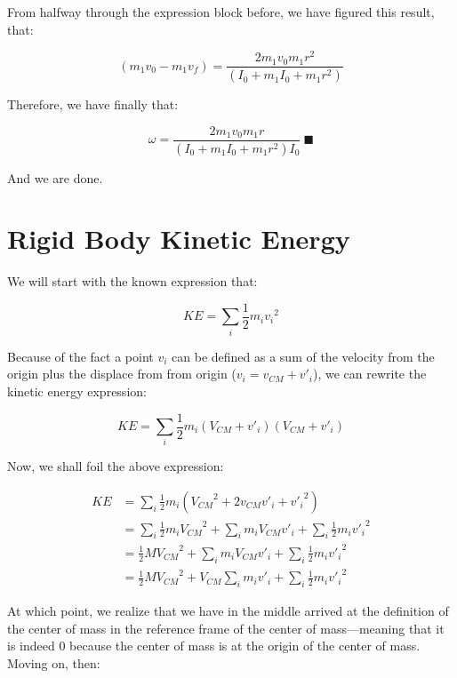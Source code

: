 \documentclass[letterpaper]{article}
\begin{document}
From halfway through the expression block before, we have figured this result, that:

\begin{equation}
 (m_1 v_0 - m_1v_f) = \frac{2m_1 v_0m_1r^2}{(I_0+m_1I_0+m_1r^2)}
\end{equation}

Therefore, we have finally that:

\begin{equation}
    \omega = \frac{2m_1 v_0m_1r}{(I_0+m_1I_0+m_1r^2)I_0}\ \blacksquare
\end{equation}

And we are done.

\section{Rigid Body Kinetic Energy}
\label{sec:org988cefc}
We will start with the known expression that:

\begin{equation}
   KE = \sum_i \frac{1}{2} m_i{v_i}^2
\end{equation}

Because of the fact a point \(v_i\) can be defined as a sum of the velocity from the origin plus the displace from from origin (\(v_i = v_{CM}+v'_i\)), we can rewrite the kinetic energy expression:

\begin{equation}
   KE = \sum_i  \frac{1}{2}  m_i (V_{CM}+v'_i)(V_{CM}+v'_i)
\end{equation}

Now, we shall foil the above expression:

\begin{align}
   KE &= \sum_i  \frac{1}{2}  m_i ({V_{CM}}^2+2v_{CM}v'_i+{v'_i}^2) \\
&= \sum_i  \frac{1}{2}  m_i {V_{CM}}^2+ \sum_i  m_i V_{CM}v'_i+\sum_i  \frac{1}{2}  m_i {v'_i}^2 \\
&= \frac{1}{2}  M {V_{CM}}^2+ \sum_i  m_i V_{CM}v'_i+\sum_i  \frac{1}{2} m_i {v'_i}^2 \\
&= \frac{1}{2}  M {V_{CM}}^2+ V_{CM}\sum_i  m_i v'_i+\sum_i  \frac{1}{2} m_i {v'_i}^2 
\end{align}

At which point, we realize that we have in the middle arrived at the definition of the center of mass in the reference frame of the center of mass---meaning that it is indeed \(0\) because the center of mass is at the origin of the center of mass. Moving on, then:
\end{document}
